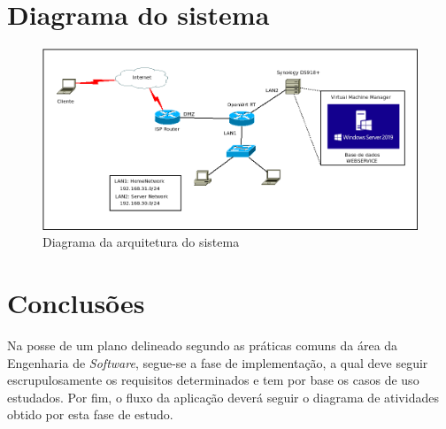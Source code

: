 \section{Diagrama do sistema}
\label{sec::engsoft:diagrama-sistema}

\begin{figure}[!htbp]
	\centering
	\includegraphics[scale=0.37]{Imagens/DiagramaIdeal.png}	\caption[Diagrama da arquitetura do sistema]{Diagrama da arquitetura do sistema}
	\label{fig::diagrama-sistema}
\end{figure}


\section{Conclusões}
\label{sec::engsoft:conclusao}

Na posse de um plano delineado segundo as práticas comuns da área da Engenharia de \textit{Software}, segue-se a fase de implementação, a qual deve seguir escrupulosamente os requisitos determinados e tem por base os casos de uso estudados. Por fim, o fluxo da aplicação deverá seguir o diagrama de atividades obtido por esta fase de estudo.

